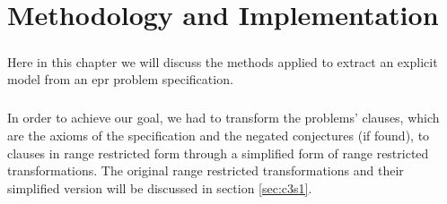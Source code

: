 \chapter{Methodology and Implementation}\label{chap:meth_and_impl}

	\paragraph{} 
	Here in this chapter we will discuss the methods applied to extract an explicit model from an \ac{epr} problem specification. 
\begin{comment}	
For how they are implemented using E's data structures and configurations, and how to run the program, please refer to chapter \ref{chap:appendix_imp} in the appendix.
\end{comment}


	\paragraph{} 
	In order to achieve our goal, we had to transform the problems' clauses, which are the axioms of the specification and the negated conjectures (if found), to clauses in range restricted form through a simplified form of range restricted transformations. The original range restricted transformations and their simplified version will be discussed in section \ref{sec:c3s1}.  

	
	
	